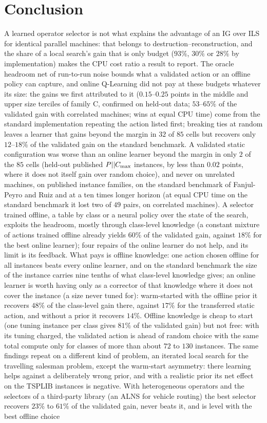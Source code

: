 \section{Conclusion}
\label{sec:conclusion}
A learned operator selector is not what explains the advantage of an IG over ILS for identical parallel machines: that belongs to destruction--reconstruction, and the share of a local search's gain that is only budget ($93\%$, $30\%$ or $28\%$ by implementation) makes the CPU cost ratio a result to report. The oracle headroom net of run-to-run noise bounds what a validated action or an offline policy can capture, and online Q-Learning did not pay at these budgets whatever its size: the gains we first attributed to it ($0.15$--$0.25$ points in the middle and upper size terciles of family C, confirmed on held-out data; $53$--$65\%$ of the validated gain with correlated machines; wins at equal CPU time) come from the standard implementation repeating the action listed first; breaking ties at random leaves a learner that gains beyond the margin in $32$ of $85$ cells but recovers only $12$--$18\%$ of the validated gain on the standard benchmark. A validated static configuration was worse than an online learner beyond the margin in only $2$ of the $85$ cells (held-out published $P||C_{\max}$ instances, by less than $0.02$ points, where it does not itself gain over random choice), and never on unrelated machines, on published instance families, on the standard benchmark of Fanjul-Peyro and Ruiz and at a ten times longer horizon (at equal CPU time on the standard benchmark it lost two of $49$ pairs, on correlated machines). A selector trained offline, a table by class or a neural policy over the state of the search, exploits the headroom, mostly through class-level knowledge (a constant mixture of actions trained offline already yields $60\%$ of the validated gain, against $18\%$ for the best online learner); four repairs of the online learner do not help, and its limit is its feedback. What pays is offline knowledge: one action chosen offline for all instances beats every online learner, and on the standard benchmark the size of the instance carries nine tenths of what class-level knowledge gives; an online learner is worth having only as a corrector of that knowledge where it does not cover the instance (a size never tuned for): warm-started with the offline prior it recovers $48\%$ of the class-level gain there, against $17\%$ for the transferred static action, and without a prior it recovers $14\%$. Offline knowledge is cheap to start (one tuning instance per class gives $81\%$ of the validated gain) but not free: with its tuning charged, the validated action is ahead of random choice with the same total compute only for classes of more than about $72$ to $130$ instances. The same findings repeat on a different kind of problem, an iterated local search for the travelling salesman problem, except the warm-start asymmetry: there learning helps against a deliberately wrong prior, and with a realistic prior its net effect on the TSPLIB instances is negative. With heterogeneous operators and the selectors of a third-party library (an ALNS for vehicle routing) the best selector recovers $23\%$ to $61\%$ of the validated gain, never beats it, and is level with the best offline choice 